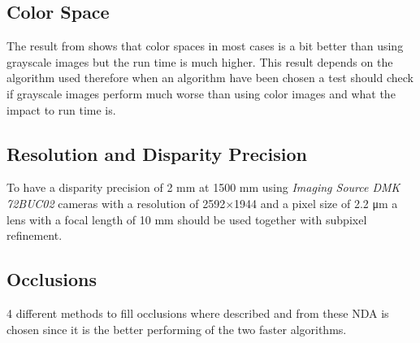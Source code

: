 \subsection*{Color Space}
The result from \cite{chambon2005colour} shows that color spaces in most cases is a bit better than using grayscale images but the run time is much higher. This result depends on the algorithm used therefore when an algorithm have been chosen a test should check if grayscale images perform much worse than using color images and what the impact to run time is.

\subsection*{Resolution and Disparity Precision}
To have a disparity precision of 2 mm at 1500 mm using \textit{Imaging Source DMK 72BUC02} cameras with a resolution of 2592$\times$1944 and a pixel size of 2.2 \si{\micro\meter} a lens with a focal length of 10 mm should be used together with subpixel refinement.

\subsection*{Occlusions}
4 different methods to fill occlusions where described and from these NDA is chosen since it is the better performing of the two faster algorithms.